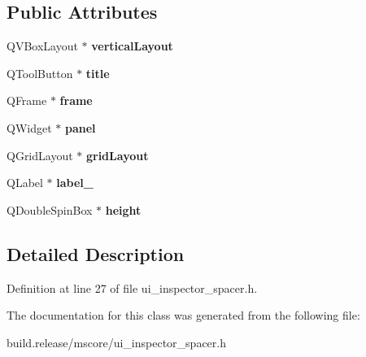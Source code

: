 \subsection*{Public Attributes}
\begin{DoxyCompactItemize}
\item 
\mbox{\label{class_ui___inspector_spacer_a09b09218acbb5eee942a0b524819f504}} 
Q\+V\+Box\+Layout $\ast$ {\bfseries vertical\+Layout}
\item 
\mbox{\label{class_ui___inspector_spacer_a9fb8df13f2d9b76285b414e2cff61dfe}} 
Q\+Tool\+Button $\ast$ {\bfseries title}
\item 
\mbox{\label{class_ui___inspector_spacer_ad631fa488b3eded485038e81d266092b}} 
Q\+Frame $\ast$ {\bfseries frame}
\item 
\mbox{\label{class_ui___inspector_spacer_a8e514ff28114af5b814b1cb3b0e00992}} 
Q\+Widget $\ast$ {\bfseries panel}
\item 
\mbox{\label{class_ui___inspector_spacer_a60a465a16336cbd5ccb48184933569ed}} 
Q\+Grid\+Layout $\ast$ {\bfseries grid\+Layout}
\item 
\mbox{\label{class_ui___inspector_spacer_a5222b414b0b0b6384bf45e4dba08d328}} 
Q\+Label $\ast$ {\bfseries label\+\_}
\item 
\mbox{\label{class_ui___inspector_spacer_ae8e46feb543bf3d75ad6b1ce895640c8}} 
Q\+Double\+Spin\+Box $\ast$ {\bfseries height}
\end{DoxyCompactItemize}


\subsection{Detailed Description}


Definition at line 27 of file ui\+\_\+inspector\+\_\+spacer.\+h.



The documentation for this class was generated from the following file\+:\begin{DoxyCompactItemize}
\item 
build.\+release/mscore/ui\+\_\+inspector\+\_\+spacer.\+h\end{DoxyCompactItemize}

